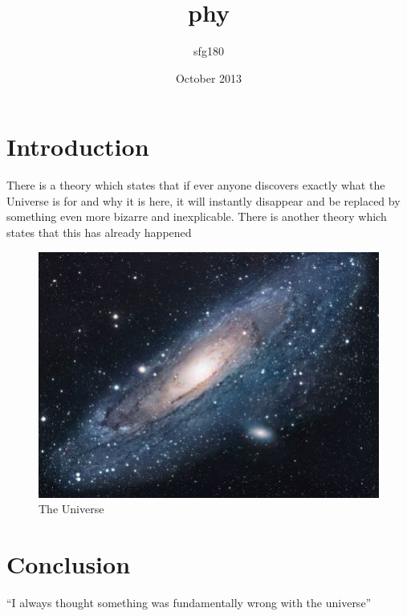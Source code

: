 \documentclass{article}
\title{phy}
\author{sfg180 }
\date{October 2013}
\begin{document}
\maketitle

\section{Introduction}
There is a theory which states that if ever anyone discovers exactly what
 the Universe is for and why it is here, 
it will instantly disappear and be replaced by something even more bizarre 
and inexplicable.
There is another theory which states that this has already happened

\begin{figure}[h!]
\centering
\includegraphics[scale=1.7]{universe.jpg}
\caption{The Universe}
\label{threadsVsSync}
\end{figure}

\section{Conclusion}
``I always thought something was fundamentally wrong with the universe'' \citep{adams1995hitchhiker}



\end{document}
